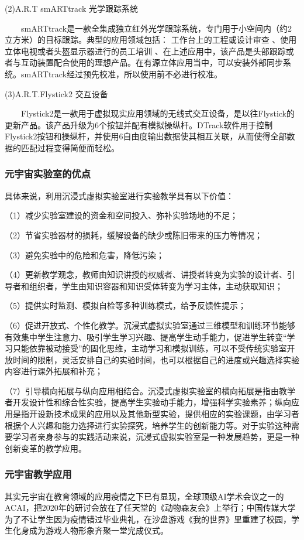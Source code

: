 \documentclass{imutthesis}
\begin{document}
\begin{itemize}
    (2)A.R.T smARTtrack 光学跟踪系统

    $\qquad$smARTtrack是一款全集成独立红外光学跟踪系统，专门用于小空间内（约2立方米）的目标跟踪。典型的应用领域包括： 工作台上的工程或设计审查 、使用立体电视或者头盔显示器进行的员工培训 、在上述应用中，该产品是头部跟踪或者与互动装置配合使用的理想产品。在有源立体应用当中，可以安装外部同步系统。smARTtrack经过预先校准，所以使用前不必进行校准。

    (3)A.R.T.Flystick2 交互设备

    $\qquad$Flystick2是一款用于虚拟现实应用领域的无线式交互设备，是以往Flystick的更新产品。该产品升级为6个按钮并配有模拟操纵杆。DTrack软件用于控制Flystick2按钮和操纵杆，并使用6自由度输出数据使其相互关联，从而使得全部数据的匹配过程变得简便而轻松。

\end{itemize}

\subsubsection{元宇宙实验室的优点}
具体来说，利用沉浸式虚拟实验室进行实验教学具有以下价值：

（1）减少实验室建设的资金和空间投入、弥补实验场地的不足；

（2）节省实验器材的损耗，缓解设备的缺少或陈旧带来的压力等情况；

（3）避免实验中的危险和危害，降低污染；

（4）更新教学观念，教师由知识讲授的权威者、讲授者转变为实验的设计者、引导者和组织者，学生由知识容器和知识受体转变为学习主体，主动获取知识；

（5）提供实时监测、模拟自检等多种训练模式，给予反馈性提示；

（6）促进开放式、个性化教学。沉浸式虚拟实验室通过三维模型和训练环节能够有效集中学生注意力、吸引学生学习兴趣、提高学生动手能力，促进学生转变“学习只能依靠被动接受”的固化思维，主动学习和模拟训练，可以不受传统实验室开放时间的限制，灵活安排自己的实验时间，也可以根据自己的进度或兴趣选择实验内容进行课外拓展和补充；

（7）引导横向拓展与纵向应用相结合。沉浸式虚拟实验室的横向拓展是指由教学者开发设计性和综合性实验，提高学生实验动手能力，增强科学实验素养；纵向应用是指开设新技术成果的应用以及其他新型实验，提供相应的实验课题，由学习者根据个人兴趣和能力选择进行实验探究，培养学生的创新能力等。对于实验这种需要学习者亲身参与的实践活动来说，沉浸式虚拟实验室是一种发展趋势，更是一种创新变革的教学应用。
\subsubsection{元宇宙教学应用}
其实元宇宙在教育领域的应用疫情之下已有显现，全球顶级AI学术会议之一的ACAI，把2020年的研讨会放在了任天堂的《动物森友会》上举行；中国传媒大学为了不让学生因为疫情错过毕业典礼，在沙盘游戏《我的世界》里重建了校园，学生化身成为游戏人物形象齐聚一堂完成仪式。
\end{document}
